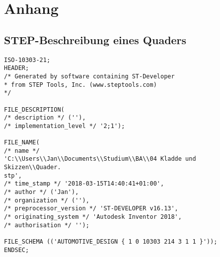 \section{Anhang}

\subsection{STEP-Beschreibung eines Quaders}
\label{sec:anhang}

\begin{lstlisting}[captionpos=b, style=customc, caption=Beschreibung eines Quaders in STEP, label=lis:simplestp]
ISO-10303-21;
HEADER;
/* Generated by software containing ST-Developer
* from STEP Tools, Inc. (www.steptools.com) 
*/

FILE_DESCRIPTION(
/* description */ (''),
/* implementation_level */ '2;1');

FILE_NAME(
/* name */ 
'C:\\Users\\Jan\\Documents\\Studium\\BA\\04 Kladde und Skizzen\\Quader.
stp',
/* time_stamp */ '2018-03-15T14:40:41+01:00',
/* author */ ('Jan'),
/* organization */ (''),
/* preprocessor_version */ 'ST-DEVELOPER v16.13',
/* originating_system */ 'Autodesk Inventor 2018',
/* authorisation */ '');

FILE_SCHEMA (('AUTOMOTIVE_DESIGN { 1 0 10303 214 3 1 1 }'));
ENDSEC;


\end{lstlisting}
